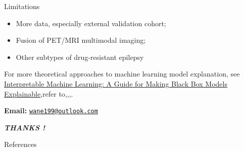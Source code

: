 \documentclass[
  11pt,
  ignorenonframetext,
  fontset=fandol]{beamer}
\newif\ifbibliography
\begin{document}
\begin{frame}{Limitations}
\protect\hypertarget{limitations}{}
\begin{itemize}[<+->]
\item More data, especially external validation cohort;
\bigskip
\item Fusion of PET/MRI multimodal imaging;
\bigskip
\item Other subtypes of drug-resistant epilepsy
\end{itemize}
\end{frame}

\begin{frame}{}
\protect\hypertarget{section-1}{}
For more theoretical approaches to machine learning model explanation,
see
\href{https://christophm.github.io/interpretable-ml-book/}{Interpretable
Machine Learning: A Guide for Making Black Box Models Explainable},refer
to\citep{beghi2019global},\citep{rajpurkar2021deep},\citep{mlr3book},\citep{molnar2022}.

\bigskip

\textbf{Email:}
\href{mailto:wane199@outlook.com}{\nolinkurl{wane199@outlook.com}}
\end{frame}

\begin{frame}{}
\protect\hypertarget{section-2}{}
\begin{center}
  \emph{\textbf{\Huge{{THANKS !}}}}
\end{center}
%
%
\end{frame}

\renewcommand\refname{References}
\begin{frame}[allowframebreaks]{References}
  \bibliographytrue
  
\end{frame}
\end{document}
